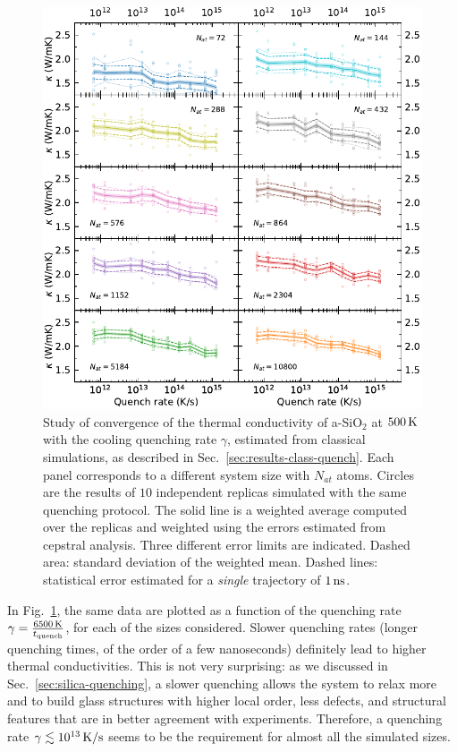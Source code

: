\begin{figure}[!tb]
    \centering
    \includegraphics[width=\textwidth]{chapters/chapter6/figures/Silica_NVT_kappa_QTIMEconv.pdf}
    \caption{Study of convergence of the thermal conductivity of a-SiO$_2$ at $500\,\mathrm{K}$ with the cooling quenching rate $\gamma$, estimated from classical simulations, as described in Sec.~\ref{sec:results-class-quench}. 
    Each panel corresponds to a different system size with $N_{at}$ atoms.
    Circles are the results of $10$ independent replicas simulated with the same quenching protocol. The solid line is a weighted average computed over the replicas and weighted using the errors estimated from cepstral analysis. Three different error limits are indicated. 
    Dashed area: standard deviation of the weighted mean. 
    Dashed lines: statistical error estimated for a \emph{single} trajectory of $1\,\mathrm{ns}$. 
    }
    \label{fig:results-class-kappa-vs-quench}
\end{figure}

In Fig.~\ref{fig:results-class-kappa-vs-quench}, the same data are plotted as a function of the quenching rate $\gamma = \frac{6500\,\mathrm{K}}{t_{\mathrm{quench}}}$, for each of the sizes considered. 
Slower quenching rates (longer quenching times, of the order of a few nanoseconds) definitely lead to higher thermal conductivities. 
This is not very surprising: as we discussed in Sec.~\ref{sec:silica-quenching}, a slower quenching allows the system to relax more and to build glass structures with higher local order, less defects, and structural features that are in better agreement with experiments. 
Therefore, a quenching rate $\gamma \lesssim 10^{13}\,\mathrm{K/s}$ seems to be the requirement for almost all the simulated sizes. 

